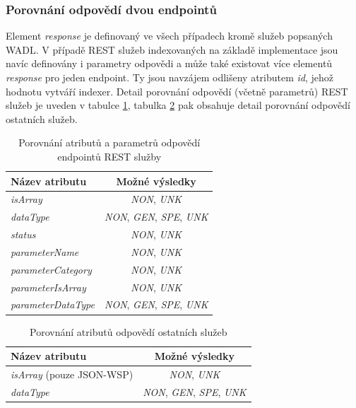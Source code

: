 \documentclass[czech,DP]{thesiskiv}
\begin{document}
\subsubsection{Porovnání odpovědí dvou endpointů}

Element \textit{response} je definovaný ve všech případech kromě služeb popsaných WADL. V případě REST služeb indexovaných na základě implementace jsou navíc definovány i parametry odpovědi a může také existovat více elementů \textit{response} pro jeden endpoint. Ty jsou navzájem odlišeny atributem \textit{id}, jehož hodnotu vytváří indexer. Detail porovnání odpovědí (včetně parametrů) REST služeb je uveden v tabulce \ref{tab:resp-rest-cmp}, tabulka \ref{tab:resp-ws-cmp} pak obsahuje detail porovnání odpovědí ostatních služeb.

\begin{table}[h]
	\centering
	\begin{tabular}{|l|c|}
		\hline
		Název atributu & Možné výsledky \\
		\hline
		\hline
		\textit{isArray} & \textit{NON}, \textit{UNK} \\
		\hline
		\textit{dataType} &  \textit{NON}, \textit{GEN}, \textit{SPE}, \textit{UNK} \\
		\hline
		\textit{status} &  \textit{NON}, \textit{UNK} \\
		\hline
		\textit{parameterName} & \textit{NON}, \textit{UNK} \\
		\hline
		\textit{parameterCategory} & \textit{NON}, \textit{UNK} \\
		\hline
		\textit{parameterIsArray} &  \textit{NON}, \textit{UNK} \\
		\hline
		\textit{parameterDataType} & \textit{NON}, \textit{GEN}, \textit{SPE}, \textit{UNK} \\
		\hline
	\end{tabular}
	\caption{Porovnání atributů a parametrů odpovědí endpointů REST služby}
	\label{tab:resp-rest-cmp}
\end{table}

\begin{table}[h]
	\centering
	\begin{tabular}{|l|c|}
		\hline
		Název atributu & Možné výsledky \\
		\hline
		\hline
		\textit{isArray} (pouze JSON-WSP) & \textit{NON}, \textit{UNK} \\
		\hline
		\textit{dataType} & \textit{NON}, \textit{GEN}, \textit{SPE}, \textit{UNK} \\
		\hline
	\end{tabular}
	\caption{Porovnání atributů odpovědí ostatních služeb}
	\label{tab:resp-ws-cmp}
\end{table}
\end{document}
